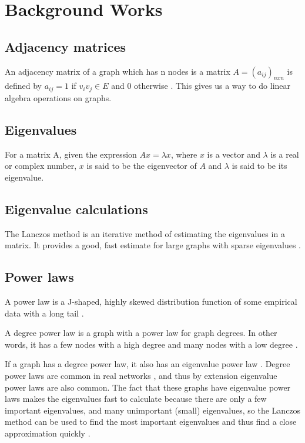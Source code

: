 \documentclass{acm_proc_article-sp}
\begin{document}
\section{Background Works}

\subsection{Adjacency matrices}
An adjacency matrix of a graph which has n nodes is a matrix $A = 
(a_{ij})_{nxn}$ is defined by $a_{ij} = 1$ if $v_iv_j \in E$ and $0$ otherwise
\cite{diestel}.  This gives us a way to do linear algebra operations on graphs.

\subsection{Eigenvalues}
For a matrix A, given the expression $Ax = \lambda x$, where $x$ is a vector and
$\lambda$ is a real or complex number, $x$ is said to be the eigenvector of $A$
and $\lambda$ is said to be its eigenvalue. \cite{lovasz}

\subsection{Eigenvalue calculations}
The Lanczos method is an iterative method of estimating the eigenvalues in a
matrix. It provides a good, fast estimate for large graphs with sparse
eigenvalues \cite{golub}.

\subsection{Power laws}
A power law is a J-shaped, highly skewed distribution function of some
empirical data with a long tail \cite{simon}.

A degree power law is a graph with a power law for graph degrees. In other
words, it has a few nodes with a high degree and many nodes with a low degree
\cite{mihail}.

If a graph has a degree power law, it also has an eigenvalue power law
\cite{mihail}. Degree power laws are common in real networks \cite{original},
and thus by extension eigenvalue power laws are also common. The fact that
these graphs have eigenvalue power laws makes the eigenvalues fast to calculate
because there are only a few important eigenvalues, and many unimportant
(small) eigenvalues, so the Lanczos method can be used to find the most
important eigenvalues and thus find a close approximation quickly \cite{original}.
\end{document}
